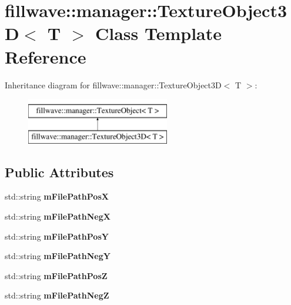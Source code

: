 \hypertarget{classfillwave_1_1manager_1_1TextureObject3D}{}\section{fillwave\+:\+:manager\+:\+:Texture\+Object3\+D$<$ T $>$ Class Template Reference}
\label{classfillwave_1_1manager_1_1TextureObject3D}
Inheritance diagram for fillwave\+:\+:manager\+:\+:Texture\+Object3\+D$<$ T $>$\+:\begin{figure}[H]
\begin{center}
\leavevmode
\includegraphics[height=2.000000cm]{classfillwave_1_1manager_1_1TextureObject3D}
\end{center}
\end{figure}
\subsection*{Public Attributes}
\begin{DoxyCompactItemize}
\item 
\hypertarget{classfillwave_1_1manager_1_1TextureObject3D_aefb6c2054c50ecfaaf2f7801e7eab052}{}std\+::string {\bfseries m\+File\+Path\+Pos\+X}\label{classfillwave_1_1manager_1_1TextureObject3D_aefb6c2054c50ecfaaf2f7801e7eab052}

\item 
\hypertarget{classfillwave_1_1manager_1_1TextureObject3D_af352b7149808a2a794929ffb8ced8ccb}{}std\+::string {\bfseries m\+File\+Path\+Neg\+X}\label{classfillwave_1_1manager_1_1TextureObject3D_af352b7149808a2a794929ffb8ced8ccb}

\item 
\hypertarget{classfillwave_1_1manager_1_1TextureObject3D_af532360464d2ec106e2208590603cdcd}{}std\+::string {\bfseries m\+File\+Path\+Pos\+Y}\label{classfillwave_1_1manager_1_1TextureObject3D_af532360464d2ec106e2208590603cdcd}

\item 
\hypertarget{classfillwave_1_1manager_1_1TextureObject3D_a89a65d370e4b6c571e86062132788094}{}std\+::string {\bfseries m\+File\+Path\+Neg\+Y}\label{classfillwave_1_1manager_1_1TextureObject3D_a89a65d370e4b6c571e86062132788094}

\item 
\hypertarget{classfillwave_1_1manager_1_1TextureObject3D_abac8f3c1804eaf17fe0e54f28625f530}{}std\+::string {\bfseries m\+File\+Path\+Pos\+Z}\label{classfillwave_1_1manager_1_1TextureObject3D_abac8f3c1804eaf17fe0e54f28625f530}

\item 
\hypertarget{classfillwave_1_1manager_1_1TextureObject3D_a2f7218466022ef68d0635ee304c705ce}{}std\+::string {\bfseries m\+File\+Path\+Neg\+Z}\label{classfillwave_1_1manager_1_1TextureObject3D_a2f7218466022ef68d0635ee304c705ce}

\end{DoxyCompactItemize}


